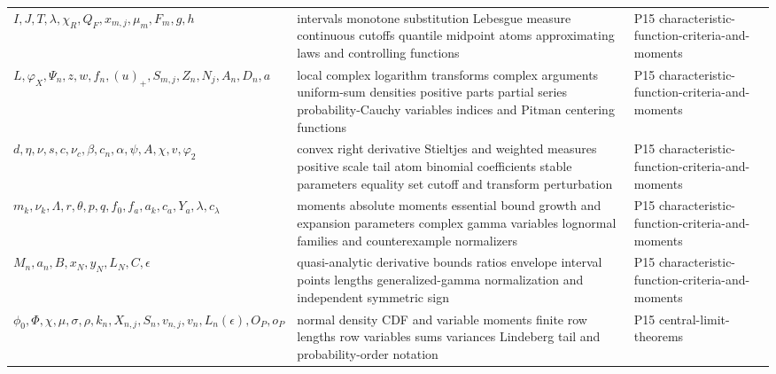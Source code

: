 \begin{longtable}{@{}p{}p{}p{}@{}}
\(I,\allowbreak J,\allowbreak T,\allowbreak \lambda,\allowbreak \chi_R,\allowbreak Q_F,\allowbreak x_{m,j},\allowbreak \mu_m,\allowbreak F_m,\allowbreak g,\allowbreak h\) & intervals monotone substitution Lebesgue measure continuous cutoffs quantile midpoint atoms approximating laws and controlling functions & P15 characteristic-\allowbreak{}function-\allowbreak{}criteria-\allowbreak{}and-\allowbreak{}moments \\
\(L,\allowbreak \varphi_X,\allowbreak \Psi_n,\allowbreak z,\allowbreak w,\allowbreak f_n,\allowbreak (u)_+,\allowbreak S_{m,j},\allowbreak Z_n,\allowbreak N_j,\allowbreak A_n,\allowbreak D_n,\allowbreak a\) & local complex logarithm transforms complex arguments uniform-sum densities positive parts partial series probability-Cauchy variables indices and Pitman centering functions & P15 characteristic-\allowbreak{}function-\allowbreak{}criteria-\allowbreak{}and-\allowbreak{}moments \\
\(d,\allowbreak \eta,\allowbreak \nu,\allowbreak s,\allowbreak c,\allowbreak \nu_c,\allowbreak \beta,\allowbreak c_n,\allowbreak \alpha,\allowbreak \psi,\allowbreak A,\allowbreak \chi,\allowbreak v,\allowbreak \varphi_2\) & convex right derivative Stieltjes and weighted measures positive scale tail atom binomial coefficients stable parameters equality set cutoff and transform perturbation & P15 characteristic-\allowbreak{}function-\allowbreak{}criteria-\allowbreak{}and-\allowbreak{}moments \\
\(m_k,\allowbreak \nu_k,\allowbreak \Lambda,\allowbreak r,\allowbreak \theta,\allowbreak p,\allowbreak q,\allowbreak f_0,\allowbreak f_a,\allowbreak a_k,\allowbreak c_a,\allowbreak Y_a,\allowbreak \lambda,\allowbreak c_\lambda\) & moments absolute moments essential bound growth and expansion parameters complex gamma variables lognormal families and counterexample normalizers & P15 characteristic-\allowbreak{}function-\allowbreak{}criteria-\allowbreak{}and-\allowbreak{}moments \\
\(M_n,\allowbreak a_n,\allowbreak B,\allowbreak x_N,\allowbreak y_N,\allowbreak L_N,\allowbreak C,\allowbreak \epsilon\) & quasi-analytic derivative bounds ratios envelope interval points lengths generalized-gamma normalization and independent symmetric sign & P15 characteristic-\allowbreak{}function-\allowbreak{}criteria-\allowbreak{}and-\allowbreak{}moments \\
\(\phi_0,\allowbreak \Phi,\allowbreak \chi,\allowbreak \mu,\allowbreak \sigma,\allowbreak \rho,\allowbreak k_n,\allowbreak X_{n,j},\allowbreak S_n,\allowbreak v_{n,j},\allowbreak v_n,\allowbreak L_n(\epsilon),\allowbreak O_P,\allowbreak o_P\) & normal density CDF and variable moments finite row lengths row variables sums variances Lindeberg tail and probability-order notation & P15 central-\allowbreak{}limit-\allowbreak{}theorems \\

\end{longtable}
